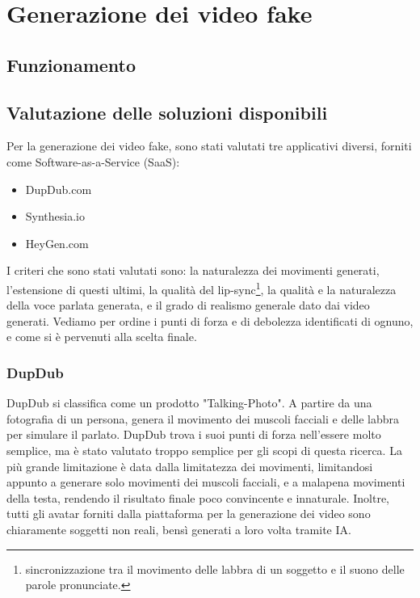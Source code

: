 \chapter{Generazione dei video fake}

\section{Funzionamento}

\section{Valutazione delle soluzioni disponibili}

Per la generazione dei video fake, sono stati valutati tre applicativi diversi, forniti come Software-as-a-Service (SaaS):
\begin{itemize}
    \item DupDub.com
    \item Synthesia.io
    \item HeyGen.com
\end{itemize}

I criteri che sono stati valutati sono: la naturalezza dei movimenti generati, l'estensione di questi ultimi, la qualità del lip-sync\footnote{sincronizzazione tra il movimento delle labbra di un soggetto e il suono delle parole pronunciate.}, la qualità e la naturalezza della voce parlata generata, e il grado di realismo generale dato dai video generati. Vediamo per ordine i punti di forza e di debolezza identificati di ognuno, e come si è pervenuti alla scelta finale. 

\subsection{DupDub}

DupDub si classifica come un prodotto "Talking-Photo". A partire da una fotografia di un persona, genera il movimento dei muscoli facciali e delle labbra per simulare il parlato. DupDub trova i suoi punti di forza nell'essere molto semplice, ma è stato valutato troppo semplice per gli scopi di questa ricerca. La più grande limitazione è data dalla limitatezza dei movimenti, limitandosi appunto a generare solo movimenti dei muscoli facciali, e a malapena movimenti della testa, rendendo il risultato finale poco convincente e innaturale. Inoltre, tutti gli avatar forniti dalla piattaforma per la generazione dei video sono chiaramente soggetti non reali, bensì generati a loro volta tramite IA.

